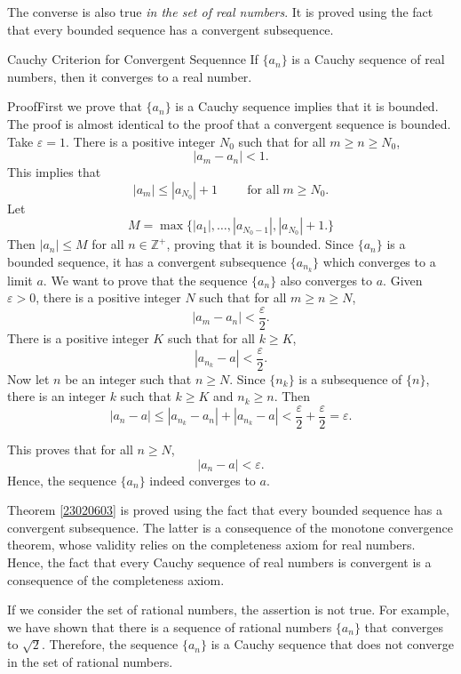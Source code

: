 The converse is also true \emph{in the set of real numbers}. It is proved using the fact that every bounded sequence has a convergent subsequence.

\begin{theorem}[label=23020603]{Cauchy Criterion for Convergent Sequennce}
If $\{a_n\}$ is a Cauchy sequence of real numbers, then it converges to a real number.
\end{theorem}
\begin{myproof}
{Proof}First we prove that   $\{a_n\}$ is a Cauchy sequence implies that it is bounded. The proof is almost identical to the proof that a convergent sequence is bounded.
Take $\varepsilon=1$. There is  a positive integer $N_0$ such that for all $m\geq n\geq N_0$, 
\[|a_m-a_n|<1.\]
This implies that 
\[|a_m|\leq |a_{N_0}|+1\hspace{1cm}\text{for all}\;m\geq {N_0}.\]\bp
Let
\[M=\max\{|a_1|, \ldots, |a_{N_0-1}|, |a_{N_0}|+1.\}\] Then $|a_n|\leq M$ for all $n\in\mathbb{Z}^+$, proving that it is bounded.
Since $\{a_n\}$ is a bounded sequence, it has a convergent subsequence $\{a_{n_k}\}$ which converges to a limit $a$. We want to prove that the sequence $\{a_n\}$ also converges to $a$.
Given $\varepsilon>0$, there is a positive integer $N$ such that for all $m\geq n\geq N$,
\[|a_{m}-a_n|<\frac{\varepsilon}{2}.\]
There is a positive integer $K$ such that for all $k\geq K$,
\[|a_{n_k}-a|<\frac{\varepsilon}{2}.\]
 Now let $n$ be an integer such that $n\geq N$. Since $\{n_k\}$ is a subsequence of $\{n\}$, there is an integer $k$ such that $k\geq K$ and $n_k\geq n$. Then
\[|a_n-a|\leq |a_{n_k}-a_n|+|a_{n_k}-a|<\frac{\varepsilon}{2}+\frac{\varepsilon}{2}=\varepsilon.\]

 This proves that for all $n\geq N$,
\[|a_n-a|<\varepsilon.\] Hence, the sequence $\{a_n\}$ indeed converges to $a$.
\end{myproof}
 Theorem \ref{23020603} is proved using the fact that every bounded sequence has a convergent subsequence. The latter is a consequence of the monotone convergence theorem, whose validity relies on the completeness axiom for real numbers.
 Hence, the fact that every Cauchy sequence of real numbers is convergent is a consequence of the completeness axiom.
 
   If we consider the set of rational numbers, the assertion is not true. For example, we have shown that there is a sequence of rational numbers $\{a_n\}$ that converges to $\sqrt{2}$. Therefore, the sequence $\{a_n\}$ is a Cauchy sequence that does not converge in the set of rational numbers. 

